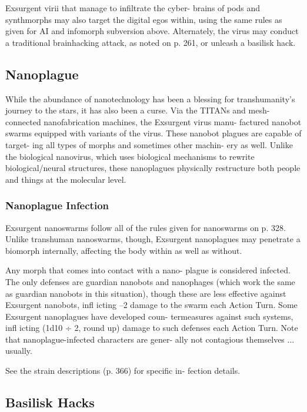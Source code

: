 Exsurgent virii that manage to infiltrate the cyber-
brains of pods and synthmorphs may also target the 
digital egos within, using the same rules as given for 
AI and infomorph subversion above. Alternately, the 
virus may conduct a traditional brainhacking attack, 
as noted on p. 261, or unleash a basilisk hack. 

\subsection{Nanoplague}

While the abundance of nanotechnology has been a 
blessing for transhumanity's journey to the stars, it has 
also been a curse. Via the TITANs and mesh-connected 
nanofabrication machines, the Exsurgent virus manu-
factured nanobot swarms equipped with variants of 
the virus. These nanobot plagues are capable of target-
ing all types of morphs and sometimes other machin-
ery as well. Unlike the biological nanovirus, which uses 
biological mechanisms to rewrite biological/neural 
structures, these nanoplagues physically restructure 
both people and things at the molecular level.

\subsubsection{Nanoplague Infection}

Exsurgent nanoswarms follow all of the rules given 
for nanoswarms on p. 328. Unlike transhuman 
nanoswarms, though, Exsurgent nanoplagues may 
penetrate a biomorph internally, affecting the body 
within as well as without.

Any morph that comes into contact with a nano-
plague is considered infected. The only defenses are 
guardian nanobots and nanophages (which work the 
same as guardian nanobots in this situation), though 
these are less effective against Exsurgent nanobots, 
infl icting –2 damage to the swarm each Action Turn. 
Some Exsurgent nanoplagues have developed coun-
termeasures against such systems, infl icting (1d10 ÷ 2, 
round up) damage to such defenses each Action Turn. 
Note that nanoplague-infected characters are gener-
ally not contagious themselves ... usually.

See the strain descriptions (p. 366) for specific in-
fection details.

\subsection{Basilisk Hacks}

